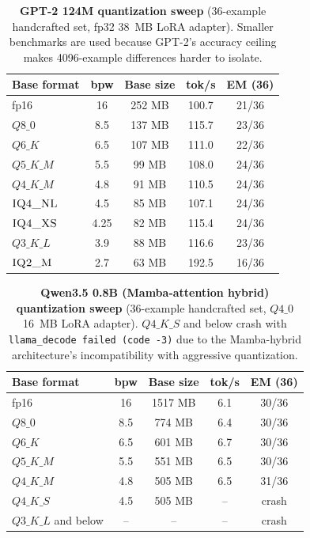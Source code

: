 \begin{table}[!h]
\centering
\caption{\label{tab:quant_gpt2}\textbf{GPT-2 124M quantization sweep} (36-example handcrafted set, fp32 38~MB LoRA adapter). Smaller benchmarks are used because GPT-2's accuracy ceiling makes 4096-example differences harder to isolate.}
\small
\setlength{\tabcolsep}{4pt}
\begin{tabular}{@{}lcccc@{}}
\toprule
Base format & bpw & Base size & tok/s & EM (36) \\
\midrule
fp16                  & 16    & 252 MB & 100.7 & 21/36 \\
$Q8\_0$               & 8.5   & 137 MB & 115.7 & 23/36 \\
$Q6\_K$               & 6.5   & 107 MB & 111.0 & 22/36 \\
$Q5\_K\_M$            & 5.5   &  99 MB & 108.0 & 24/36 \\
$Q4\_K\_M$            & 4.8   &  91 MB & 110.5 & 24/36 \\
$\textsc{IQ4\_NL}$    & 4.5   &  85 MB & 107.1 & 24/36 \\
$\textsc{IQ4\_XS}$    & 4.25  &  82 MB & 115.4 & 24/36 \\
$Q3\_K\_L$            & 3.9   &  88 MB & 116.6 & 23/36 \\
$\textsc{IQ2\_M}$     & 2.7   &  63 MB & 192.5 & 16/36 \\
\bottomrule
\end{tabular}
\end{table}

\begin{table}[!h]
\centering
\caption{\label{tab:quant_qwen35}\textbf{Qwen3.5 0.8B (Mamba-attention hybrid) quantization sweep} (36-example handcrafted set, $Q4\_0$ 16~MB LoRA adapter). $Q4\_K\_S$ and below crash with \texttt{llama\_decode failed (code -3)} due to the Mamba-hybrid architecture's incompatibility with aggressive quantization.}
\small
\setlength{\tabcolsep}{4pt}
\begin{tabular}{@{}lcccc@{}}
\toprule
Base format & bpw & Base size & tok/s & EM (36) \\
\midrule
fp16                  & 16    & 1517 MB & 6.1 & 30/36 \\
$Q8\_0$               & 8.5   &  774 MB & 6.4 & 30/36 \\
$Q6\_K$               & 6.5   &  601 MB & 6.7 & 30/36 \\
$Q5\_K\_M$            & 5.5   &  551 MB & 6.5 & 30/36 \\
$Q4\_K\_M$            & 4.8   &  505 MB & 6.5 & 31/36 \\
$Q4\_K\_S$            & 4.5   &  505 MB & --   & crash \\
$Q3\_K\_L$ and below  & --    &  --     & --   & crash \\
\bottomrule
\end{tabular}
\end{table}


